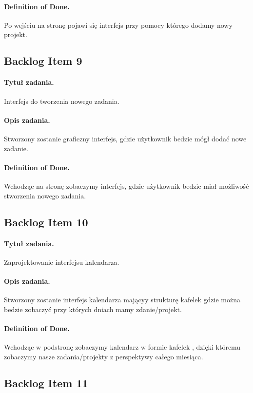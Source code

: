 ﻿\documentclass[a4paper]{article}
\begin{document}
\paragraph{Definition of Done.} Po wejściu na stronę pojawi się interfejs przy pomocy którego dodamy nowy projekt.

\subsection{Backlog Item 9} 
\paragraph{Tytuł zadania.} Interfejs do tworzenia nowego zadania.
\paragraph{Opis zadania.} Stworzony zostanie graficzny interfejs, gdzie użytkownik bedzie mógł dodać nowe zadanie.
\paragraph{Definition of Done.} Wchodząc na stronę zobaczymy interfejs, gdzie użytkownik bedzie miał możliwość stworzenia nowego zadania.

\subsection{Backlog Item 10} 
\paragraph{Tytuł zadania.} Zaprojektowanie interfejsu kalendarza.
\paragraph{Opis zadania.} Stworzony zostanie interfejs kalendarza mającyy strukturę kafelek gdzie można bedzie zobaczyć przy których dniach mamy zdanie/projekt.
\paragraph{Definition of Done.} Wchodząc w podstronę zobaczymy kalendarz w formie kafelek , dzięki któremu zobaczymy nasze zadania/projekty z perspektywy całego miesiąca.

\subsection{Backlog Item 11} 
\end{document}
